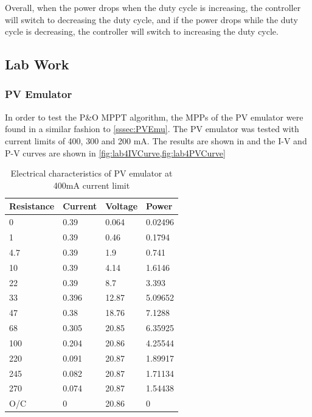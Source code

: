 \documentclass[]{article}
\begin{document}
			Overall, when the power drops when the duty cycle is increasing, the controller will switch to decreasing the duty cycle, and if the power drops while the duty cycle is decreasing, the controller will switch to increasing the duty cycle.
			 
		\subsection{Lab Work}
			\subsubsection{PV Emulator}
				In order to test the P\&O MPPT algorithm, the MPPs of the PV emulator were found in a similar fashion to \cref{sssec:PVEmu}. The PV emulator was tested with current limits of 400, 300 and 200 mA. The results are shown in  and the I-V and P-V curves are shown in \cref{fig:lab4IVCurve,fig:lab4PVCurve}
				\begin{table}[H]
					\centering	 				
					\begin{tabular}{|l|l|l|l|}
						\hline	 					
						Resistance & Current & Voltage & Power \\ \hline
						0 & 0.39 & 0.064 & 0.02496 \\ \hline
						1 & 0.39 & 0.46 & 0.1794 \\ \hline
						4.7 & 0.39 & 1.9 & 0.741 \\ \hline
						10 & 0.39 & 4.14 & 1.6146 \\ \hline
						22 & 0.39 & 8.7 & 3.393 \\ \hline
						33 & 0.396 & 12.87 & 5.09652 \\ \hline
						47 & 0.38 & 18.76 & 7.1288 \\ \hline
						68 & 0.305 & 20.85 & 6.35925 \\ \hline
						100 & 0.204 & 20.86 & 4.25544 \\ \hline
						220 & 0.091 & 20.87 & 1.89917 \\ \hline
						245 & 0.082 & 20.87 & 1.71134 \\ \hline
						270 & 0.074 & 20.87 & 1.54438 \\ \hline
						O/C & 0 & 20.86 & 0 \\ \hline			 					
					\end{tabular}
			 		\caption{Electrical characteristics of PV emulator at 400mA current limit}
			 		\label{tbl:lab4_400emu}
				\end{table}
\end{document}
